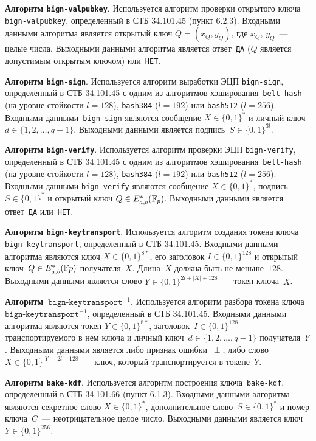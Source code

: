 {\bf Алгоритм \texttt{bign-valpubkey}}.
Используется алгоритм проверки открытого ключа 
\texttt{bign-valpubkey}, определенный в СТБ 34.101.45 (пункт 6.2.3). Входными 
данными алгоритма является открытый ключ $Q = (x_Q, y_Q)$, 
где $x_Q$, $y_Q$~--- целые числа. Выходными данными алгоритма является 
ответ~\texttt{ДА} ($Q$ является допустимым открытым ключом) или~\texttt{НЕТ}.

{\bf Алгоритм \texttt{bign-sign}}. Используется алгоритм выработки ЭЦП 
\texttt{bign-sign}, определенный в СТБ 34.101.45 с одним из алгоритмов
хэширования~\texttt{belt-hash} (на уровне стойкости $l=128$),
\texttt{bash384} ($l=192$) или \texttt{bash512} ($l=256$).
%
Входными данными~\texttt{bign-sign} являются сообщение 
$X\in\{0,1\}^*$ и личный ключ~$d\in\{1,2,\ldots,q-1\}$.
Выходными данными является подпись~$S\in\{0,1\}^{3l}$.

{\bf Алгоритм \texttt{bign-verify}}.
Используется алгоритм проверки ЭЦП \texttt{bign-verify}, 
определенный в СТБ 34.101.45 с одним из алгоритмов 
хэширования~\texttt{belt-hash} (на уровне стойкости $l=128$),  
\texttt{bash384} ($l=192$) или \texttt{bash512} ($l=256$). 
Входными данными \texttt{bign-verify} являются сообщение $X\in\{0,1\}^*$, 
подпись $S\in\{0,1\}^*$ и открытый ключ $Q \in E_{a,b}^*({\mathbb F}_p)$.
Выходными данными является ответ~\texttt{ДА} или~\texttt{НЕТ}.

{\bf Алгоритм \texttt{bign-keytransport}}.
Используется алгоритм создания токена ключа 
\texttt{bign-keytransport}, определенный в СТБ 34.101.45.
Входными данными алгоритма являются ключ $X\in\{0,1\}^{8*}$, 
его заголовок $I\in\{0,1\}^{128}$ и открытый ключ~$Q\in E_{a,b}^*({\mathbb F} p)$ 
получателя~$X$. Длина~$X$ должна быть не меньше~$128$.
Выходными данными является слово $Y\in\{0,1\}^{2l+|X|+128}$~--- токен ключа~$X$.
 
{\bf Алгоритм~$\texttt{bign-keytransport}^{-1}$}.
Используется алгоритм разбора токена ключа~$\texttt{bign-keytransport}^{-1}$, 
определенный в СТБ 34.101.45. Входными данными алгоритма являются токен 
$Y\in\{0,1\}^{8*}$, заголовок~$I\in\{0,1\}^{128}$ транспортируемого в нем ключа 
и личный ключ~$d\in\{1,2,\ldots,q-1\}$ получателя~$Y$.
Выходными данными является либо признак ошибки~$\perp$, 
либо слово~$X\in\{0,1\}^{|Y|-2l-128}$~--- ключ, 
который транспортируется в токене~$Y$.

{\bf Алгоритм \texttt{bake-kdf}}.
Используется алгоритм построения ключа~\texttt{bake-kdf}, 
определенный в СТБ 34.101.66 (пункт 6.1.3). Входными данными алгоритма 
являются секретное слово $X\in\{0,1\}^*$, 
дополнительное слово~$S\in\{0,1\}^*$ и номер ключа~$C$~--– 
неотрицательное целое число. Выходными данными является 
ключ~$Y\in\{0,1\}^{256}$.
 
